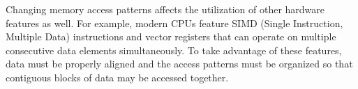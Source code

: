 

Changing memory access patterns affects the utilization of other hardware features as well. For example, modern CPUs feature SIMD (Single Instruction, Multiple Data) instructions and vector registers that can operate on multiple consecutive data elements simultaneously. To take advantage of these features, data must be properly aligned and the access patterns must be organized so that contiguous blocks of data may be accessed together.



